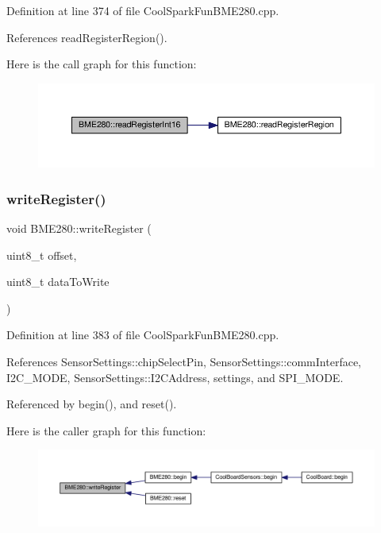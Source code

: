 Definition at line 374 of file Cool\+Spark\+Fun\+B\+M\+E280.\+cpp.



References read\+Register\+Region().

Here is the call graph for this function\+:
\nopagebreak
\begin{figure}[H]
\begin{center}
\leavevmode
\includegraphics[width=350pt]{df/dcf/class_b_m_e280_ac43c30f9b321d301694094d6b4bebe7e_cgraph}
\end{center}
\end{figure}
\mbox{\label{class_b_m_e280_afcff21c342725246bf415d7f0e4d04f0}} 
\subsubsection{\texorpdfstring{write\+Register()}{writeRegister()}}
{\footnotesize\ttfamily void B\+M\+E280\+::write\+Register (\begin{DoxyParamCaption}\item[{uint8\+\_\+t}]{offset,  }\item[{uint8\+\_\+t}]{data\+To\+Write }\end{DoxyParamCaption})}



Definition at line 383 of file Cool\+Spark\+Fun\+B\+M\+E280.\+cpp.



References Sensor\+Settings\+::chip\+Select\+Pin, Sensor\+Settings\+::comm\+Interface, I2\+C\+\_\+\+M\+O\+DE, Sensor\+Settings\+::\+I2\+C\+Address, settings, and S\+P\+I\+\_\+\+M\+O\+DE.



Referenced by begin(), and reset().

Here is the caller graph for this function\+:
\nopagebreak
\begin{figure}[H]
\begin{center}
\leavevmode
\includegraphics[width=350pt]{df/dcf/class_b_m_e280_afcff21c342725246bf415d7f0e4d04f0_icgraph}
\end{center}
\end{figure}


